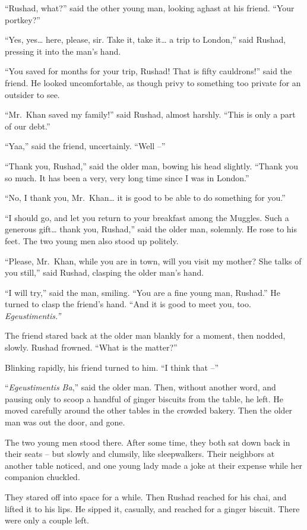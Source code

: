 ``Rushad, what?'' said the other young man, looking aghast at his
friend. ``Your portkey?''

``Yes, yes\ldots{} here, please, sir. Take it, take it\ldots{} a trip to
London,'' said Rushad, pressing it into the man's hand.

``You saved for months for your trip, Rushad! That is fifty cauldrons!''
said the friend. He looked uncomfortable, as though privy to something
too private for an outsider to see.

``Mr.~Khan saved my family!'' said Rushad, almost harshly. ``This is
only a part of our debt.''

``Yaa,'' said the friend, uncertainly. ``Well --''

``Thank you, Rushad,'' said the older man, bowing his head slightly.
``Thank you so much. It has been a very, very long time since I was in
London.''

``No, I thank you, Mr.~Khan\ldots{} it is good to be able to do
something for you.''

``I should go, and let you return to your breakfast among the Muggles.
Such a generous gift\ldots{} thank you, Rushad,'' said the older man,
solemnly. He rose to his feet. The two young men also stood up politely.

``Please, Mr.~Khan, while you are in town, will you visit my mother? She
talks of you still,'' said Rushad, clasping the older man's hand.

``I will try,'' said the man, smiling. ``You are a fine young man,
Rushad.'' He turned to clasp the friend's hand. ``And it is good to meet
you, too. \emph{Egeustimentis.''}

The friend stared back at the older man blankly for a moment, then
nodded, slowly. Rushad frowned. ``What is the matter?''

Blinking rapidly, his friend turned to him. ``I think that --''

``\emph{Egeustimentis Ba},'' said the older man. Then, without another
word, and pausing only to scoop a handful of ginger biscuits from the
table, he left. He moved carefully around the other tables in the
crowded bakery. Then the older man was out the door, and gone.

The two young men stood there. After some time, they both sat down back
in their seats -- but slowly and clumsily, like sleepwalkers. Their
neighbors at another table noticed, and one young lady made a joke at
their expense while her companion chuckled.

They stared off into space for a while. Then Rushad reached for his
chai, and lifted it to his lips. He sipped it, casually, and reached for
a ginger biscuit. There were only a couple left.

